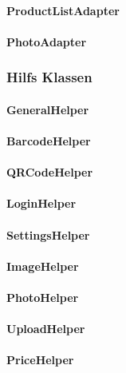 \documentclass{scrartcl}
\begin{document}
\paragraph{ProductListAdapter}

\paragraph{PhotoAdapter}

\subsubsection{Hilfs Klassen}

\paragraph{GeneralHelper}

\paragraph{BarcodeHelper}

\paragraph{QRCodeHelper}

\paragraph{LoginHelper}

\paragraph{SettingsHelper}

\paragraph{ImageHelper}

\paragraph{PhotoHelper}

\paragraph{UploadHelper}

\paragraph{PriceHelper}
\end{document}
